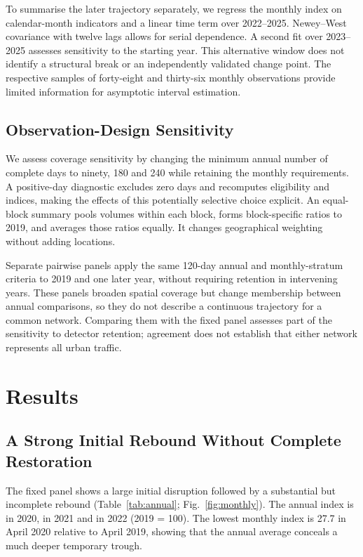 \documentclass[]{interact}
\begin{document}
To summarise the later trajectory separately, we regress the monthly index on calendar-month indicators and a linear time term over 2022--2025. Newey--West covariance \cite{newey1987} with twelve lags allows for serial dependence. A second fit over 2023--2025 assesses sensitivity to the starting year. This alternative window does not identify a structural break or an independently validated change point. The respective samples of forty-eight and thirty-six monthly observations provide limited information for asymptotic interval estimation.

\subsection{Observation-Design Sensitivity}
We assess coverage sensitivity by changing the minimum annual number of complete days to ninety, 180 and 240 while retaining the monthly requirements. A positive-day diagnostic excludes zero days and recomputes eligibility and indices, making the effects of this potentially selective choice explicit. An equal-block summary pools volumes within each block, forms block-specific ratios to 2019, and averages those ratios equally. It changes geographical weighting without adding locations.

Separate pairwise panels apply the same 120-day annual and monthly-stratum criteria to 2019 and one later year, without requiring retention in intervening years. These panels broaden spatial coverage but change membership between annual comparisons, so they do not describe a continuous trajectory for a common network. Comparing them with the fixed panel assesses part of the sensitivity to detector retention; agreement does not establish that either network represents all urban traffic.

\section{Results}
\subsection{A Strong Initial Rebound Without Complete Restoration}
The fixed panel shows a large initial disruption followed by a substantial but incomplete rebound (Table~\ref{tab:annual}; Fig.~\ref{fig:monthly}). The annual index is \IndexTwenty{} in 2020, \IndexTwentyOne{} in 2021 and \IndexTwentyTwo{} in 2022 (2019 = 100). The lowest monthly index is 27.7 in April 2020 relative to April 2019, showing that the annual average conceals a much deeper temporary trough.
\end{document}
